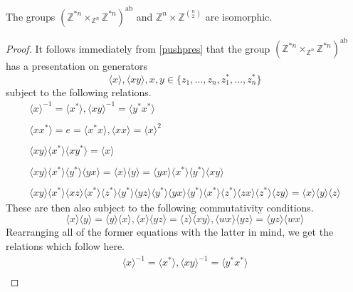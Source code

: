 \documentclass{amsbook} %
\newcommand{\ab}{\mathrm{ab}}
\numberwithin{section}{chapter}
\begin{document}
\begin{prop} \label{abst}
The groups
  $
    (\mathbb{Z}^{\ast n} \times_{\mathbb{Z}^n} \mathbb{Z}^{\ast n})^{\ab}
  $
and
  $
    \mathbb{Z}^n \times {\mathbb{Z}}^{\binom{n}{2}}
  $
are isomorphic.
\end{prop}
\begin{proof}
It follows immediately from \cref{pushpres} that the group $(\mathbb{Z}^{\ast n} \times_{\mathbb{Z}^n} \mathbb{Z}^{\ast n})^{\ab}$ has a presentation on generators
  \[
    \langle x \rangle, \langle xy \rangle, x,y \in \{z_1, \ldots, z_n, z_1^*, \ldots, z_n^*\}
  \]
subject to the following relations.
  \[
    \begin{array}{c}
    	\langle x \rangle^{-1}  =  \langle x^* \rangle,    \langle xy \rangle^{-1}  =  \langle y^*x^* \rangle \\
    	\\
    	\langle xx^* \rangle  =  e  =  \langle x^*x \rangle,    \langle xx \rangle  =  \langle x \rangle^2 \\
    	\\
    	\langle xy \rangle \langle x^* \rangle \langle xy^* \rangle  =  \langle x \rangle  \\
    	\\
    	\langle xy \rangle \langle x^* \rangle \langle y^* \rangle \langle yx \rangle  =  \langle x \rangle \langle y \rangle   =  \langle yx \rangle \langle x^* \rangle \langle y^* \rangle \langle xy \rangle \\
    	\\
    	\langle xy \rangle \langle x^* \rangle \langle xz \rangle \langle x^* \rangle \langle z^* \rangle \langle y^* \rangle \langle yz \rangle \langle y^* \rangle \langle yx \rangle \langle y^* \rangle \langle x^* \rangle \langle z^* \rangle \langle zx \rangle \langle z^* \rangle \langle zy \rangle  =  \langle x \rangle\langle y \rangle\langle z \rangle 
    \end{array}
  \]
These are then also subject to the following commutativity conditions.
  \[
    \langle x \rangle \langle y \rangle = \langle y \rangle \langle x \rangle,   \langle x \rangle \langle yz \rangle = \langle z \rangle \langle xy \rangle,  	\langle wx \rangle \langle yz \rangle = \langle yz \rangle \langle wx \rangle
  \] 
Rearranging all of the former equations with the latter in mind, we get the relations which follow here.
  \[
    \begin{array}{c}
    	\langle x \rangle^{-1}  =  \langle x^* \rangle,    \langle xy \rangle^{-1}  =  \langle y^*x^* \rangle \\

\end{array}\]
\end{proof}
\end{document}

